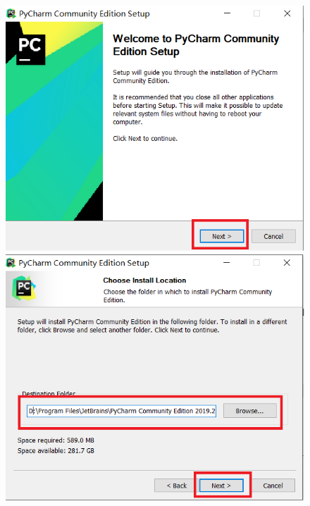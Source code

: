 \clearpage
\begin{figure}[!ht]
  \centering
  \includegraphics[scale=0.5]{figure/chapter1/pycharm5.png}\quad
  \includegraphics[scale=0.5]{figure/chapter1/pycharm2.png}
\end{figure}

